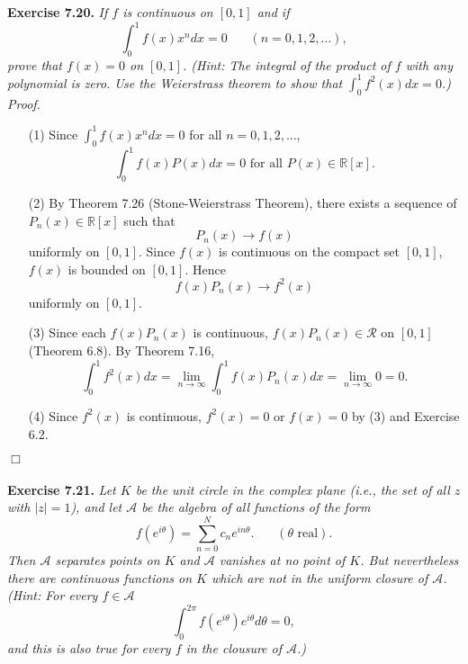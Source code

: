 \documentclass{article}
\begin{document}



\textbf{Exercise 7.20.}
\emph{If $f$ is continuous on $[0,1]$ and if
\[
  \int_{0}^{1} f(x) x^n dx = 0
  \:\:\:\:\:\:\:\:
  (n=0,1,2,\ldots),
\]
prove that $f(x) = 0$ on $[0,1]$.
(Hint: The integral of the product of $f$ with any polynomial is zero.
Use the Weierstrass theorem to show that
$\int_{0}^{1} f^2(x) dx = 0$.)} \\

\emph{Proof.}
\begin{enumerate}
\item[(1)]
Since $\int_{0}^{1} f(x) x^n dx = 0$ for all $n = 0,1,2,\ldots$,
\[
  \int_{0}^{1} f(x) P(x) dx = 0 \text{ for all } P(x) \in \mathbb{R}[x].
\]

\item[(2)]
By Theorem 7.26 (Stone-Weierstrass Theorem),
there exists a sequence of $P_n(x) \in \mathbb{R}[x]$ such that
\[
  P_n(x) \to f(x)
\]
uniformly on $[0,1]$.
Since $f(x)$ is continuous on the compact set $[0,1]$, $f(x)$ is bounded on $[0,1]$.
Hence
\[
  f(x) P_n(x) \to f^2(x)
\]
uniformly on $[0,1]$.

\item[(3)]
Since each $f(x) P_n(x)$ is continuous,
$f(x) P_n(x) \in \mathscr{R}$ on $[0,1]$ (Theorem 6.8).
By Theorem 7.16,
\[
  \int_{0}^{1} f^2(x) dx
  = \lim_{n \to \infty} \int_{0}^{1} f(x) P_n(x) dx
  = \lim_{n \to \infty} 0
  = 0.
\]

\item[(4)]
Since $f^2(x)$ is continuous,
$f^2(x) = 0$ or $f(x) = 0$ by (3) and Exercise 6.2.
\end{enumerate}
$\Box$ \\\\






\textbf{Exercise 7.21.}
\emph{Let $K$ be the unit circle in the complex plane
(i.e., the set of all $z$ with $|z|=1$),
and let $\mathscr{A}$ be the algebra of all functions of the form
\[
  f(e^{i\theta}) = \sum_{n=0}^{N} c_n e^{in\theta}.
  \:\:\:\:\:\:\:\:
  (\theta \text{ real}).
\]
Then $\mathscr{A}$ separates points on $K$ and
$\mathscr{A}$ vanishes at no point of $K$.
But nevertheless there are continuous functions on $K$ which
are not in the uniform closure of $\mathscr{A}$.
(Hint: For every $f \in \mathscr{A}$
\[
  \int_{0}^{2\pi} f(e^{i\theta})e^{i\theta}d\theta = 0,
\]
and this is also true for every $f$ in the clousure of $\mathscr{A}$.)} \\
\end{document}
